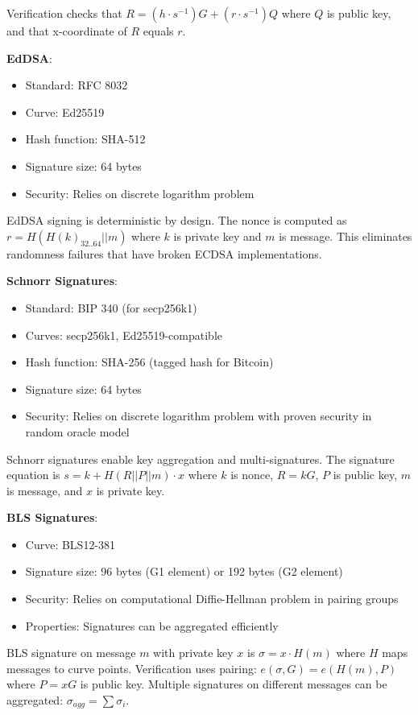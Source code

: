 Verification checks that $R = (h \cdot s^{-1})G + (r \cdot s^{-1})Q$
where $Q$ is public key, and that x-coordinate of $R$ equals $r$.

\textbf{EdDSA}:

\begin{itemize}
\item Standard: RFC 8032
\item Curve: Ed25519
\item Hash function: SHA-512
\item Signature size: 64 bytes
\item Security: Relies on discrete logarithm problem
\end{itemize}

EdDSA signing is deterministic by design. The nonce is computed as $r
= H(H(k)_{32..64} || m)$ where $k$ is private key and $m$ is
message. This eliminates randomness failures that have broken ECDSA
implementations.

\textbf{Schnorr Signatures}:

\begin{itemize}
\item Standard: BIP 340 (for secp256k1)
\item Curves: secp256k1, Ed25519-compatible
\item Hash function: SHA-256 (tagged hash for Bitcoin)
\item Signature size: 64 bytes
\item Security: Relies on discrete logarithm problem with proven
  security in random oracle model
\end{itemize}

Schnorr signatures enable key aggregation and multi-signatures. The
signature equation is $s = k + H(R || P || m) \cdot x$ where $k$ is
nonce, $R = kG$, $P$ is public key, $m$ is message, and $x$ is private
key.

\textbf{BLS Signatures}:

\begin{itemize}
\item Curve: BLS12-381
\item Signature size: 96 bytes (G1 element) or 192 bytes (G2 element)
\item Security: Relies on computational Diffie-Hellman problem in
  pairing groups
\item Properties: Signatures can be aggregated efficiently
\end{itemize}

BLS signature on message $m$ with private key $x$ is $\sigma = x \cdot
H(m)$ where $H$ maps messages to curve points. Verification uses
pairing: $e(\sigma, G) = e(H(m), P)$ where $P = xG$ is public
key. Multiple signatures on different messages can be aggregated:
$\sigma_{agg} = \sum \sigma_i$.

